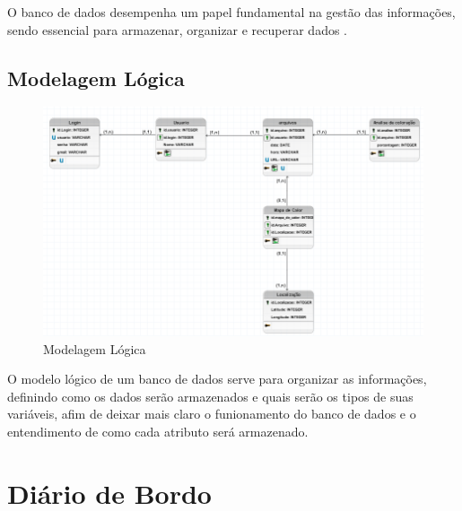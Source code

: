\documentclass[
  a4paper,%
  12pt,%
  english,%
  brazilian,%
]{article}
\begin{document}
                \newpage

                O banco de dados desempenha um papel fundamental na gestão das informações, sendo essencial para armazenar, organizar e recuperar dados
                .
                \subsection*{Modelagem Lógica}
     
                    \begin{figure}[h]
                    \centering
                    \caption{Modelagem Lógica}%
                    \label{fig:mod-logica}
                     \includegraphics[width=1.1\textwidth]{Logos/mod_logic1.png}
                    \end{figure}

                   

                    O modelo lógico de um banco de dados serve para organizar as informações, definindo como os dados serão armazenados e quais serão os tipos de suas variáveis, afim de deixar mais claro o funionamento do banco de dados e o entendimento de como cada atributo será armazenado.


                \section*{Diário de Bordo}
\end{document}
